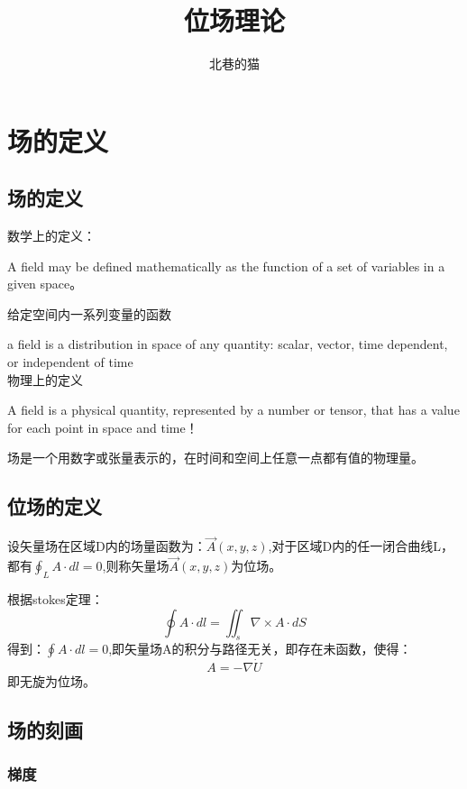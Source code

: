 \documentclass[UTF8]{ctexart}       %
\author{北巷的猫}
\title{位场理论}
\begin{document}
\maketitle              %
\pagebreak              %
\tableofcontents        %
\pagebreak              %

\section{场的定义}
    \subsection{场的定义}
    {\heiti 数学上的定义：}

    A field may be defined mathematically as the function of a set of variables in a given space。

    给定空间内一系列变量的函数

    a field is a distribution in space of any quantity: scalar, vector, time  dependent, or independent of time \\

    {\heiti 物理上的定义}

    A field is a physical quantity, represented by a number or tensor, that has a value for each point in space and time！

    场是一个用数字或张量表示的，在时间和空间上任意一点都有值的物理量。



    \subsection{位场的定义}

   设矢量场在区域D内的场量函数为：$\vec{A}(x,y,z)$,对于区域D内的任一闭合曲线L，都有$\oint_L A \cdot dl = 0$,则称矢量场$\vec{A}(x,y,z)$为位场。

   根据stokes定理：
   $$\oint A \cdot dl = \iint_s \nabla \times A \cdot dS $$
   得到：$\oint A \cdot dl = 0$,即矢量场A的积分与路径无关，即存在未函数，使得：
   $$ A = -\nabla\dot U $$
   {\color{cyan}即无旋为位场。}     %

    \subsection{场的刻画}

        \subsubsection{梯度}
        
\end{document}
